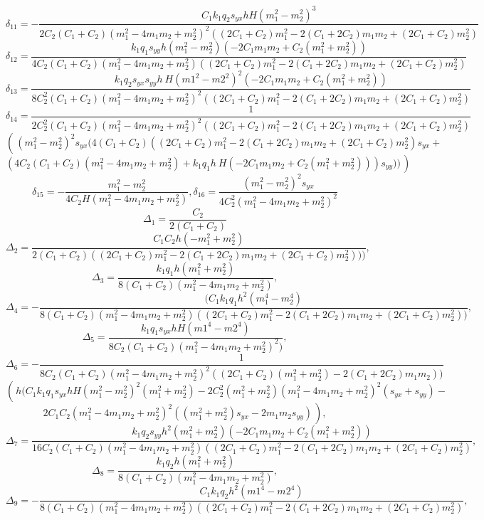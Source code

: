 \[
\delta_{11}=-\frac{C_1  k_1 q_2 s_{yx} h H(m_1^2 - m_2^2)^3 }{
	2 C_2 (C_1 + C_2) (m_1^2 - 4 m_1 m_2 + m_2^2)^2 ((2 C_1 + C_2) m_1^2 - 
	2 (C_1 + 2 C_2) m_1 m_2 + (2 C_1 + C_2) m_2^2)}
\]
\[
\delta_{12}=\frac{k_1 q_1 s_{yy} h  (m_1^2 - m_2^2) (-2 C_1 m_1 m_2 + 
	C_2 (m_1^2 + m_2^2)) }{4 C_2 (C_1 + C_2) (m_1^2 - 4 m_1 m_2 + 
	m_2^2) ((2 C_1 + C_2) m_1^2 - 2 (C_1 + 2 C_2) m_1 m_2 + (2 C_1 + C_2) m_2^2)}
\]
\[
\delta_{13}=\frac{ k_1 q_2 s_{yx} s_{yy} h~ H(m1^2 - m2^2)^2  (-2 C_1 m_1 m_2 + 
	C_2 (m_1^2 + m_2^2)) }{8 C_2^2 (C_1 + C_2) (m_1^2 - 4 m_1 m_2 + 
	m_2^2)^2 ((2 C_1 + C_2) m_1^2 - 2 (C_1 + 2 C_2) m_1 m_2 + (2 C_1 + C_2) m_2^2)}
\]
\[
\delta_{14}=\frac{1}{2 C_2^2 (C_1 + C_2) (m_1^2 - 
	4 m_1 m_2 + m_2^2)^2 ((2 C_1 + C_2) m_1^2 - 
	2 (C_1 + 2 C_2) m_1 m_2 + (2 C_1 + C_2) m_2^2)}
\]
\[
\left( \frac{}{} (m_1^2 - m_2^2)^2  s_{yx} (4 (C_1 + C_2) ((2 C_1 + C_2) m_1^2 - 
2 (C_1 + 2 C_2) m_1 m_2 + (2 C_1 + C_2) m_2^2) s_{yx} + \right.
\]
\[
\left. (4 C_2 (C_1 + 
C_2) (m_1^2 - 4 m_1 m_2 + m_2^2) +
k_1 q_1 h~ H(-2 C_1 m_1 m_2 + C_2 (m_1^2 + m_2^2)) ) s_{yy}))\frac{}{}\right)
\]
\[
\delta_{15}=-\frac{m_1^2 - m_2^2}{4 C_2 H (m_1^2 - 4 m_1 m_2 + m_2^2)}
,
\delta_{16}=\frac{(m_1^2 - m_2^2)^2 s_{yx}}{4 C_2^2 (m_1^2 - 4 m_1 m_2 + m_2^2)^2}
\]
\[
\Delta_1=\frac{C_2}{2 (C_1 + C_2)}
\]
\[
\Delta_2=\frac{C_1 C_2 h (-m_1^2 + m_2^2)}{
	2 (C_1 + C_2) ((2 C_1 + C_2) m_1^2 - 
	2 (C_1 + 2 C_2) m_1 m_2 + (2 C_1 + C_2) m_2^2)))},
\]
\[
\Delta_3=\frac{k_1 q_1 h (m_1^2 + m_2^2) }{8 (C_1 + C_2) (m_1^2 - 4 m_1 m_2 + m_2^2)},
\]
\[
\Delta_4=-\frac{(C_1 k_1  q_1  h^2(m_1^4 - m_2^4) }{
	8 (C_1 + C_2) (m_1^2 - 4 m_1 m_2 + m_2^2) ((2 C_1 + C_2) m_1^2 - 
	2 (C_1 + 2 C_2) m_1 m_2 + (2 C_1 + C_2) m_2^2))},
\]
\[
\Delta_5=\frac{ k_1 q_1 s_{yx} h H (m1^4 - m2^4) }{
	8 C_2 (C_1 + C_2) (m_1^2 - 4 m_1 m_2 + m_2^2)^2)},
\]
\[
\Delta_6=-\frac{1}{8 C_2 (C_1 + C_2) (m_1^2 - 4 m_1 m_2 + 
	m_2^2)^2 ((2 C_1 + C_2) (m_1^2+ m_2^2) - 
	2 (C_1 + 2 C_2) m_1 m_2 ))}
\]
\[
\left(\frac{}{}h (C_1  k_1  q_1 s_{yx} h H (m_1^2 - m_2^2)^2 (m_1^2 + m_2^2) - 
2 C_2^2 (m_1^2 + m_2^2) (m_1^2 - 4 m_1 m_2 + m_2^2)^2 (s_{yx} + s_{yy}) -\right.
\]
\[ 
\left.  2 C_1 C_2 (m_1^2 - 4 m_1 m_2 + m_2^2)^2 ((m_1^2 + m_2^2) s_{yx} - 
2 m_1 m_2 s_{yy})\frac{}{}\right)          ,
\]
\[
\Delta_7=\frac{ k_1 q_2 s_{yy} h^2 (m_1^2 + m_2^2) (-2 C_1 m_1 m_2 + 
	C_2 (m_1^2 + m_2^2)) }{16 C_2 (C_1 + C_2) (m_1^2 - 4 m_1 m_2 + 
	m_2^2) ((2 C_1 + C_2) m_1^2 - 2 (C_1 + 2 C_2) m_1 m_2 + (2 C_1 + C_2) m_2^2)},
\]
\[
\Delta_8=\frac{k_1 q_2 h (m_1^2 + m_2^2) }{8 (C_1 + C_2) (m_1^2 - 4 m_1 m_2 + m_2^2)},
\]
\[
\Delta_9=-\frac{C_1  k_1 q_2 h^2 (m1^4 - m2^4) }{
	8 (C_1 + C_2) (m_1^2 - 4 m_1 m_2 + m_2^2) ((2 C_1 + C_2) m_1^2 - 
	2 (C_1 + 2 C_2) m_1 m_2 + (2 C_1 + C_2) m_2^2)},
\]
